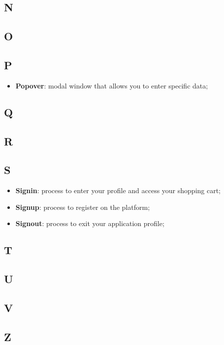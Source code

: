 \subsection{N}
\subsection{O}
\subsection{P}
\begin{itemize} 
    \item \textbf{Popover}: modal window that allows you to enter specific data;
\end{itemize}
\subsection{Q}
\subsection{R}
\subsection{S}
\begin{itemize} 
    \item \textbf{Signin}: process to enter your profile and access your shopping cart;
    \item \textbf{Signup}: process to register on the platform; 
    \item \textbf{Signout}: process to exit your application profile;
\end{itemize}
\subsection{T}
\subsection{U}
\subsection{V}
\subsection{Z}